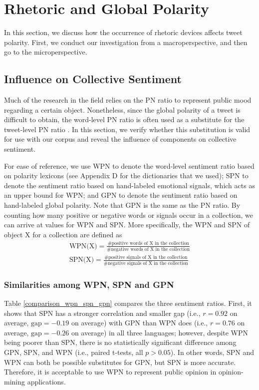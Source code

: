 \documentclass[english]{jnlp_1.4}
\begin{document}
\section{Rhetoric and Global Polarity}

In this section, we discuss how the occurrence of rhetoric devices affects tweet polarity. First, we conduct our investigation from a macroperspective, and then go to the microperspective.


\subsection{Influence on Collective Sentiment}

Much of the research in the field relies on the PN ratio to represent public mood regarding a certain object. Nonetheless, since the global polarity of a tweet is difficult to obtain, the word-level PN ratio is often used as a substitute for the tweet-level PN ratio \cite{Bollen11,Si13}. In this section, we verify whether this substitution is valid for use with our corpus and reveal the influence of components on collective sentiment.

For ease of reference, we use WPN to denote the word-level sentiment ratio based on polarity lexicons (see Appendix D for the dictionaries that we used); SPN to denote the sentiment ratio based on hand-labeled emotional signals, which acts as an upper bound for WPN; and GPN to denote the sentiment ratio based on hand-labeled global polarity. Note that GPN is the same as the PN ratio. By counting how many positive or negative words or signals occur in a collection, we can arrive at values for WPN and SPN. More specifically, the WPN and SPN of object X for a collection are defined as
\begin{gather}
\text{WPN(X)} = \frac{\text{\#positive words of X in the collection}}{\text{\#negative words of X in the collection}} \\[1ex]
\text{SPN(X)} = \frac{\text{\#positive signals of X in the collection}}{\text{\#negative signals of X in the collection}}
\end{gather}


\subsubsection{Similarities among WPN, SPN and GPN}

Table \ref{comparison_wpn_spn_gpn} compares the three sentiment ratios. First, it shows that SPN has a stronger correlation and smaller gap (i.e., $r = 0.92$ on average, $\text{gap} = -0.19$ on average) with GPN than WPN does (i.e., $r = 0.76$ on average, $\text{gap} = -0.26$ on average) in all three languages; however, despite WPN being poorer than SPN, there is no statistically significant difference among GPN, SPN, and WPN (i.e., paired t-tests, all $p > 0.05$). In other words, SPN and WPN can both be possible substitutes for GPN, but SPN is more accurate. Therefore, it is acceptable to use WPN to represent public opinion in opinion-mining applications.
\end{document}
